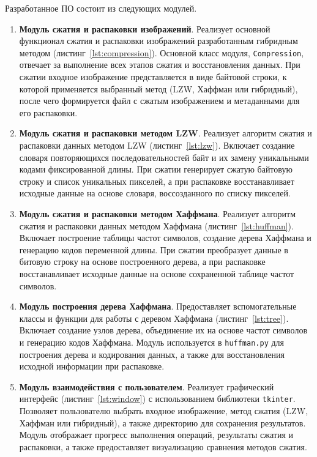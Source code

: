 Разработанное ПО состоит из следующих модулей.
\begin{enumerate}
    \item \textbf{Модуль сжатия и распаковки изображений}. Реализует основной функционал сжатия и распаковки изображений разработанным гибридным методом (листинг~\ref{lst:compression}). Основной класс модуля, \texttt{Compression}, отвечает за выполнение всех этапов сжатия и восстановления данных. При сжатии входное изображение представляется в виде байтовой строки, к которой применяется выбранный метод (LZW, Хаффман или гибридный), после чего формируется файл с сжатым изображением и метаданными для его распаковки.
    \item \textbf{Модуль сжатия и распаковки методом LZW}. Реализует алгоритм сжатия и распаковки данных методом LZW (листинг~\ref{lst:lzw}). Включает создание словаря повторяющихся последовательностей байт и их замену уникальными кодами фиксированной длины. При сжатии генерирует сжатую байтовую строку и список уникальных пикселей, а при распаковке восстанавливает исходные данные на основе словаря, воссозданного по списку пикселей.
    \item \textbf{Модуль сжатия и распаковки методом Хаффмана}. Реализует алгоритм сжатия и распаковки данных методом Хаффмана (листинг~\ref{lst:huffman}). Включает построение таблицы частот символов, создание дерева Хаффмана и генерацию кодов переменной длины. При сжатии преобразует данные в битовую строку на основе построенного дерева, а при распаковке восстанавливает исходные данные на основе сохраненной таблице частот символов.
    \item \textbf{Модуль построения дерева Хаффмана}. Предоставляет вспомогательные классы и функции для работы с деревом Хаффмана (листинг~\ref{lst:tree}). Включает создание узлов дерева, объединение их на основе частот символов и генерацию кодов Хаффмана. Модуль используется в \texttt{huffman.py} для построения дерева и кодирования данных, а также для восстановления исходной информации при распаковке.
    \item \textbf{Модуль взаимодействия с пользователем}. Реализует графический интерфейс (листинг~\ref{lst:window}) с использованием библиотеки \texttt{tkinter}. Позволяет пользователю выбрать входное изображение, метод сжатия (LZW, Хаффман или гибридный), а также директорию для сохранения результатов. Модуль отображает прогресс выполнения операций, результаты сжатия и распаковки, а также предоставляет визуализацию сравнения методов сжатия.
\end{enumerate}

